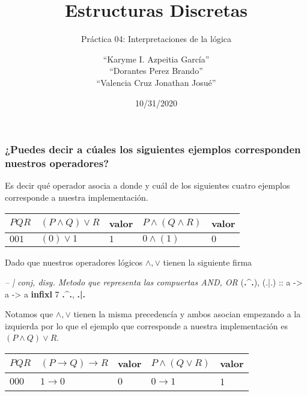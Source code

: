 \documentclass[
]{article}
\title{Estructuras Discretas}
\subtitle{Práctica 04: Interpretaciones de la lógica}
\author{``Karyme I. Azpeitia García''\\
``Dorantes Perez Brando''\\
``Valencia Cruz Jonathan Josué''}
\date{10/31/2020}
\newenvironment{Shaded}{\begin{snugshade}}{\end{snugshade}}
\newcommand{\CommentTok}[1]{\textcolor[rgb]{0.56,0.35,0.01}{\textit{#1}}}
\newcommand{\DecValTok}[1]{\textcolor[rgb]{0.00,0.00,0.81}{#1}}
\newcommand{\KeywordTok}[1]{\textcolor[rgb]{0.13,0.29,0.53}{\textbf{#1}}}
\newcommand{\NormalTok}[1]{#1}
\newcommand{\OperatorTok}[1]{\textcolor[rgb]{0.81,0.36,0.00}{\textbf{#1}}}
\newcommand{\OtherTok}[1]{\textcolor[rgb]{0.56,0.35,0.01}{#1}}
\begin{document}
\maketitle

\hypertarget{puedes-decir-a-cuxfaales-los-siguientes-ejemplos-corresponden-nuestros-operadores}{%
\subsubsection{¿Puedes decir a cúales los siguientes ejemplos
corresponden nuestros
operadores?}\label{puedes-decir-a-cuxfaales-los-siguientes-ejemplos-corresponden-nuestros-operadores}}

Es decir qué operador asocia a donde y cuál de los siguientes cuatro
ejemplos corresponde a nuestra implementación.

\begin{longtable}[]{@{}lllll@{}}
\toprule
\(P Q R\) & \((P\wedge Q)\lor R\) & valor & \(P\wedge (Q\wedge R)\) &
valor\tabularnewline
\midrule
\endhead
\(0 0 1\) & \((0)\lor 1\) & \(1\) & \(0\wedge (1)\) &
\(0\)\tabularnewline
\bottomrule
\end{longtable}

Dado que nuestros operadores lógicos \(\wedge, \lor\) tienen la
siguiente firma

\begin{Shaded}
\begin{Highlighting}[]
\CommentTok{-- | conj, disy. Metodo que representa las compuertas AND, OR                 }
\NormalTok{  (}\OperatorTok{.^.}\NormalTok{),}\OtherTok{ (.|.) ::}\NormalTok{ a }\OtherTok{->}\NormalTok{ a }\OtherTok{->}\NormalTok{ a                                                   }
  \KeywordTok{infixl} \DecValTok{7} \OperatorTok{.^.}\NormalTok{, }\OperatorTok{.|.}
\end{Highlighting}
\end{Shaded}

Notamos que \(\wedge, \lor\) tienen la misma precedencía y ambos asocian
empezando a la izquierda por lo que el ejemplo que corresponde a nuestra
implementación es \((P\wedge Q)\lor R\).

\begin{longtable}[]{@{}lllll@{}}
\toprule
\(P Q R\) & \((P\rightarrow Q)\rightarrow R\) & valor &
\(P\wedge(Q\lor R)\) & valor\tabularnewline
\midrule
\endhead
\(000\) & \(1\rightarrow 0\) & \(0\) & \(0\rightarrow 1\) &
1\tabularnewline
\bottomrule
\end{longtable}
\end{document}
